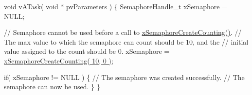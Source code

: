 \begin{DoxyPre}void vATask( void * pvParameters )
\{
SemaphoreHandle\_t xSemaphore = NULL;\end{DoxyPre}



\begin{DoxyPre}   // Semaphore cannot be used before a call to \hyperlink{vendor_2ceedling_2plugins_2freertos_2src_2freertos_2include_2semphr_8h_a7764616a918a46115403569a88148ad4}{xSemaphoreCreateCounting()}.
   // The max value to which the semaphore can count should be 10, and the
   // initial value assigned to the count should be 0.
   xSemaphore = \hyperlink{vendor_2ceedling_2plugins_2freertos_2src_2freertos_2include_2semphr_8h_a7764616a918a46115403569a88148ad4}{xSemaphoreCreateCounting( 10, 0 )};\end{DoxyPre}



\begin{DoxyPre}   if( xSemaphore != NULL )
   \{
       // The semaphore was created successfully.
       // The semaphore can now be used.
   \}
\}
\end{DoxyPre}
 